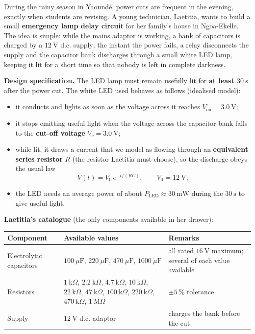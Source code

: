 \documentclass[11pt]{article}
\begin{document}
\begin{exemplebox}
During the rainy season in Yaoundé, power cuts are frequent in the evening, exactly when students are revising. A young technician, Laetitia, wants to build a small \textbf{emergency lamp delay circuit} for her family's house in Ngoa-Ekelle. The idea is simple: while the mains adaptor is working, a bank of capacitors is charged by a $12\ \mathrm{V}$ d.c. supply; the instant the power fails, a relay disconnects the supply and the capacitor bank discharges through a small white LED lamp, keeping it lit for a short time so that nobody is left in complete darkness.

\textbf{Design specification.} The LED lamp must remain usefully lit for \textbf{at least $30\ \mathrm{s}$} after the power cut. The white LED used behaves as follows (idealised model):
\begin{itemize}
\item it conducts and lights as soon as the voltage across it reaches $V_{\text{on}} = 3.0\ \mathrm{V}$;
\item it stops emitting useful light when the voltage across the capacitor bank falls to the \textbf{cut-off voltage} $V_{c} = 3.0\ \mathrm{V}$;
\item while lit, it draws a current that we model as flowing through an \textbf{equivalent series resistor} $R$ (the resistor Laetitia must choose), so the discharge obeys the usual law
\[
V(t) = V_{0}\,e^{-t/(RC)}, \qquad V_{0} = 12\ \mathrm{V};
\]
\item the LED needs an average power of about $P_{\text{LED}} \approx 30\ \mathrm{mW}$ during the $30\ \mathrm{s}$ to give useful light.
\end{itemize}

\textbf{Laetitia's catalogue} (the only components available in her drawer):

\begin{center}
\begin{tabularx}{\linewidth}{|l|X|X|}
\hline
\rowcolor{popblueL} \textbf{Component} & \textbf{Available values} & \textbf{Remarks} \\
\hline
Electrolytic capacitors & $100\ \mu\mathrm{F}$, $220\ \mu\mathrm{F}$, $470\ \mu\mathrm{F}$, $1000\ \mu\mathrm{F}$ & all rated $16\ \mathrm{V}$ maximum; several of each value available \\
\hline
Resistors & $1\ \mathrm{k}\Omega$, $2.2\ \mathrm{k}\Omega$, $4.7\ \mathrm{k}\Omega$, $10\ \mathrm{k}\Omega$, $22\ \mathrm{k}\Omega$, $47\ \mathrm{k}\Omega$, $100\ \mathrm{k}\Omega$, $220\ \mathrm{k}\Omega$, $470\ \mathrm{k}\Omega$, $1\ \mathrm{M}\Omega$ & $\pm 5\ \%$ tolerance \\
\hline
Supply & $12\ \mathrm{V}$ d.c. adaptor & charges the bank before the cut \\
\hline
\end{tabularx}
\end{center}


\end{exemplebox}
\end{document}
